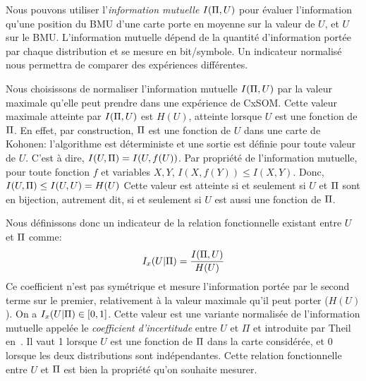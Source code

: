 Nous pouvons utiliser l'\emph{information mutuelle} $I(\Pi, U)$ pour évaluer l'information qu'une position du BMU d'une carte porte en moyenne sur la valeur de $U$, et $U$ sur le BMU.
L'information mutuelle dépend de la quantité d'information portée par chaque distribution et se mesure en bit/symbole. Un indicateur normalisé nous permettra de comparer des expériences différentes. 

Nous choisissons de normaliser l'information mutuelle $I(\Pi,U)$  par la valeur maximale qu'elle peut prendre dans une expérience de CxSOM. Cette valeur maximale atteinte par $I(\Pi,U)$ est $H(U)$, atteinte lorsque $U$ est une fonction de $\Pi$.
En effet, par construction, $\Pi$ est une fonction de $U$ dans une carte de Kohonen: l'algorithme est déterministe et une sortie est définie pour toute valeur de $U$. C'est à dire, $I(U,\Pi) = I (U, f(U))$.
Par propriété de l'information mutuelle, pour toute fonction $f$ et variables $X,Y$, $I(X,f(Y)) \leq I(X,Y) $. 
Donc, $I(U,\Pi) \leq I(U,U) = H(U)$
Cette valeur est atteinte si et seulement si $U$ et $\Pi$ sont en bijection, autrement dit, si et seulement si $U$ est aussi une fonction de $\Pi$.

Nous définissons donc un indicateur de la relation fonctionnelle existant entre $U$ et $\Pi$ comme:
\begin{equation}
I_x(U|\Pi) = \frac{I(\Pi,U)}{H(U)}
\end{equation}
Ce coefficient n'est pas symétrique et mesure l'information portée par le second terme sur le premier, relativement à la valeur maximale qu'il peut porter ($H(U)$). On a $I_x(U|\Pi) \in [0,1]$. Cette valeur est une variante normalisée de l'information mutuelle appelée le \emph{coefficient d'incertitude} entre $U$ et $\Pi$ et introduite par Theil en~\cite{Theil1961EconomicFA}.
Il vaut 1 lorsque $U$ est une fonction de $\Pi$ dans la carte considérée, et $0$ lorsque les deux distributions sont indépendantes. Cette relation fonctionnelle entre $U$ et $\Pi$ est bien la propriété qu'on souhaite mesurer.



